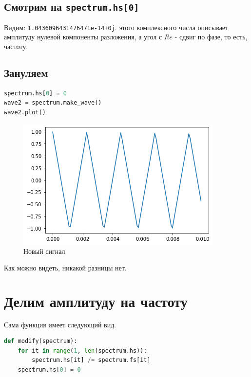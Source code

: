 \documentclass[a4paper,12pt]{report}
\begin{document}
    \section{Смотрим на \texttt{spectrum.hs[0]}}
    
    Видим: \texttt{1.0436096431476471e-14+0j}.  этого комплексного числа описывает амплитуду нулевой компоненты разложения, а угол с $Re$ - сдвиг по фазе, то есть, частоту.
    
    \section{Зануляем}
    
\begin{lstlisting}[language=Python,caption=\textquote{Зануленный} сигнал]
spectrum.hs[0] = 0
wave2 = spectrum.make_wave()
wave2.plot()
\end{lstlisting}

    \begin{figure}[H]
        \centering
        \includegraphics[width=\textwidth]{ex4_second.png}
        \caption{Новый сигнал}
        \label{fig:ex4_second}
    \end{figure}
    
    Как можно видеть, никакой разницы нет.
    
    \chapter{Делим амплитуду на частоту}
    
    Сама функция имеет следующий вид.
    
\begin{lstlisting}[language=Python,caption=Функция трансформации компонент]
def modify(spectrum):
    for it in range(1, len(spectrum.hs)):
        spectrum.hs[it] /= spectrum.fs[it]
    spectrum.hs[0] = 0
\end{lstlisting}
\end{document}
